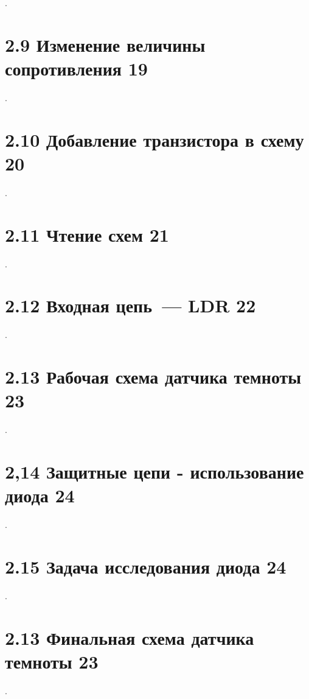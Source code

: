 .

\section{2.9 Изменение величины сопротивления 19}

.

\section{2.10 Добавление транзистора в схему 20}

.

\section{2.11 Чтение схем 21}

.

\section{2.12 Входная цепь\ --- LDR 22}

.

\section{2.13 Рабочая схема датчика темноты 23}

.

\section{2,14 Защитные цепи - использование диода 24}

.

\section{2.15 Задача исследования диода 24}

.

\section{2.13 Финальная схема датчика темноты 23}

.

